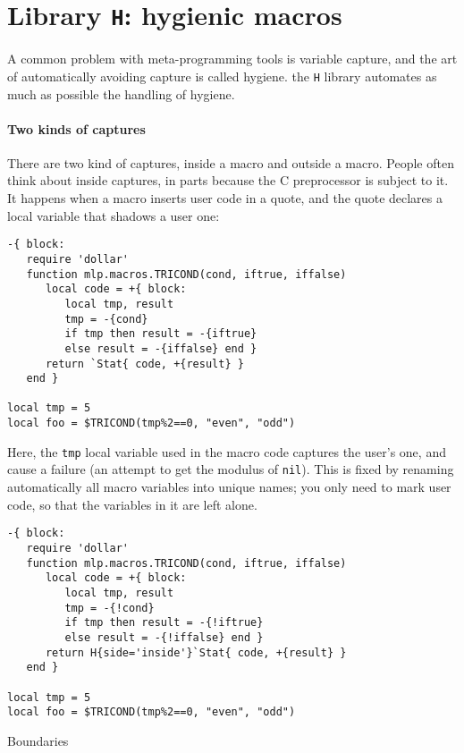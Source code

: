 \section{Library {\tt H}: hygienic macros}

A common problem with meta-programming tools is variable capture, and the art of
automatically avoiding capture is called hygiene. the {\tt H} library
automates as much as possible the handling of hygiene.

\paragraph{Two kinds of captures}
There are two kind of captures, inside a macro and outside a macro. People often
think about inside captures, in parts because the C preprocessor is subject to
it. It happens when a macro inserts user code in a quote, and the quote declares
a local variable that shadows a user one:

\begin{verbatim}
-{ block:
   require 'dollar'
   function mlp.macros.TRICOND(cond, iftrue, iffalse)
      local code = +{ block:
         local tmp, result
         tmp = -{cond}
         if tmp then result = -{iftrue} 
         else result = -{iffalse} end }
      return `Stat{ code, +{result} }
   end }

local tmp = 5
local foo = $TRICOND(tmp%2==0, "even", "odd")
\end{verbatim}

Here, the \verb|tmp| local variable used in the macro code captures the user's
one, and cause a failure (an attempt to get the modulus of \verb|nil|). This is
fixed by renaming automatically all macro variables into unique names; you only
need to mark user code, so that the variables in it are left alone. 

\begin{verbatim}
-{ block:
   require 'dollar'
   function mlp.macros.TRICOND(cond, iftrue, iffalse)
      local code = +{ block:
         local tmp, result
         tmp = -{!cond}
         if tmp then result = -{!iftrue} 
         else result = -{!iffalse} end }
      return H{side='inside'}`Stat{ code, +{result} }
   end }

local tmp = 5
local foo = $TRICOND(tmp%2==0, "even", "odd")
\end{verbatim}

Boundaries
